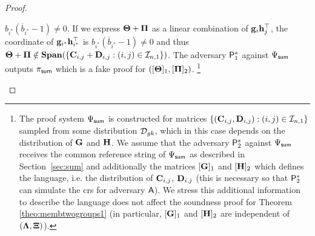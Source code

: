 \begin{proof}
\begin{itemize}
$b_{i^*}(\overline{b}_{i^*} -1) \neq 0$.
If we express $\mathbf{{\Theta}}+\mathbf{{\Pi}}$
as a linear combination of $\mathbf{g}_{i}\mathbf{h}_{j}^{\top}$, the coordinate of
$\mathbf{g}_{i^*}\mathbf{h}_{i^*}^\top$ is $b_{i^*}(\overline{b}_{i^*}-1)\neq 0$ and thus $\mathbf{{\Theta}}+\mathbf{{\Pi}}\notin\mathbf{Span}(\{\mathbf{{C}}_{i,j}+\mathbf{{D}}_{i,j}:(i,j)\in\mathcal{I}_{n,1}\})$.
The adversary $\mathsf{P}^*_1$ against ${\Psi_{\mathsf{sum}}}$  outputs  $\pi_{\mathsf{sum}}$
which is a fake proof for $([\mathbf{{\Theta}}]_1, [\mathbf{{\Pi}}]_2)$. \footnote{The proof system $\Psi_{\mathsf{sum}}$ is constructed for matrices $\{(\mathbf{{C}}_{i,j},\mathbf{{D}}_{i,j}):(i,j)\in\mathcal{I}_{n,1}\}$ sampled from some distribution $\mathcal{D}_{{gk}}$, which in this case depends on the distribution of $\mathbf{{G}}$ and $\mathbf{{H}}$. We assume that the adversary $\mathsf{P}^*_2$ against $\Psi_{\mathsf{sum}}$ receives the common reference string of $\Psi_{\mathsf{sum}}$ as described in Section~\ref{sec:sum} and additionally the matrices $[\mathbf{{G}}]_1$ and $[\mathbf{{H}}]_2$ which defines the language, i.e. the distribution of $\mathbf{{C}}_{i,j}$, $\mathbf{{D}}_{i,j}$ (this is necessary so that $\mathsf{P}^*_2$ can simulate the crs for adversary $\mathsf{A}$). We stress this additional information to describe the language does not affect the soundness proof for Theorem \ref{theo:membtwogroups1} (in particular,  $[\mathbf{{G}}]_1$ and $[\mathbf{{H}}]_2$ are independent of $(\mathbf{{\Lambda}}, \mathbf{{\Xi}})$).}
\end{itemize}
\end{proof}
